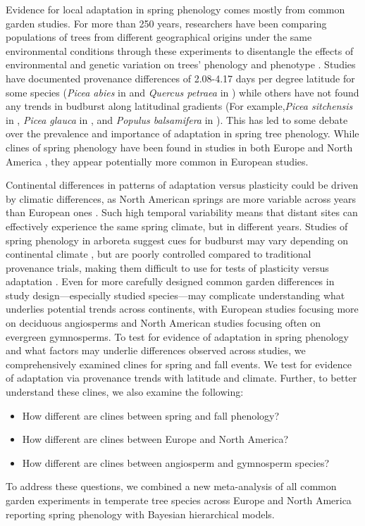 \documentclass{article}
\begin{document}
Evidence for local adaptation in spring phenology comes mostly from common garden studies. For more than 250 years, researchers have been comparing populations of trees from different geographical origins under the same environmental conditions through these experiments to disentangle the effects of environmental and genetic variation on trees’ phenology and phenotype \citep{AitkenBemmels16, Alberto13}. Studies have documented provenance differences of 2.08-4.17 days per degree latitude for some species (\emph{Picea abies} in \citealp{sog08} and \emph{Quercus petraea} in \citealp{deans96}) while others have not found any trends in budburst along latitudinal gradients (For example,\emph{Picea sitchensis} in \citealp{mimura07}, \emph{Picea glauca} in \citealp{Li97}, and \emph{Populus balsamifera} in \citealp{farmer93}). This has led to some debate over the prevalence and importance of adaptation in spring tree phenology. While clines of spring phenology have been found in studies in both Europe \citep{sog08,deans96,von95} and North America \citep{rossi15, soo13, hannerz99}, they appear potentially more common in European studies. 

Continental differences in patterns of adaptation versus plasticity could be driven by climatic differences, as North American springs are more variable across years than European ones \citep{tward21,zohner2017,schwartz00}. Such high temporal variability means that distant sites can effectively experience the same spring climate, but in different years. Studies of spring phenology in arboreta suggest cues for budburst may vary depending on continental climate \citep{cat23, ospreebbms,ospreephoto}, but are poorly controlled compared to traditional provenance trials, making them difficult to use for tests of plasticity versus adaptation \citep{gauzere2020}. Even for more carefully designed common garden differences in study design---especially studied species---may complicate understanding what underlies potential trends across continents, with European studies focusing more on deciduous angiosperms and North American studies focusing often on evergreen gymnosperms.  
To test for evidence of adaptation in spring phenology and what factors may underlie differences observed across studies, we comprehensively examined clines for spring and fall events. We test for evidence of adaptation via provenance trends with latitude and climate. Further, to better understand these clines, we also examine the following:
\begin{itemize}
\item How different are clines between spring and fall phenology? 
\item How different are clines between Europe and North America?
\item How different are clines between angiosperm and gymnosperm species?
\end{itemize}
To address these questions, we combined a new meta-analysis of all common garden experiments in temperate tree species across Europe and North America reporting spring phenology with Bayesian hierarchical models. 
\end{document}
